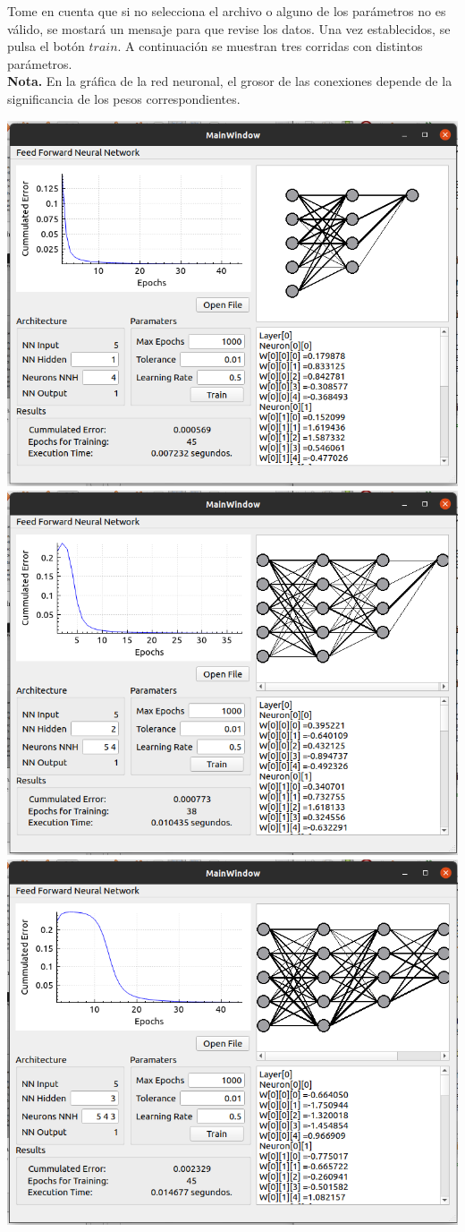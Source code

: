 \documentclass[12pt,letterpaper]{article}
\theoremstyle{definition}
\theoremstyle{definition}
\theoremstyle{definition}
\theoremstyle{definition}
\theoremstyle{definition}
\theoremstyle{definition}
\begin{document}
	Tome en cuenta que si no selecciona el archivo o alguno de los parámetros no es válido, se mostará un mensaje para que revise los datos. Una vez establecidos, se pulsa el botón $ train $. A continuación se muestran tres corridas con distintos parámetros.\\
	\textbf{Nota.} En la gráfica de la red neuronal, el grosor de las conexiones depende de la significancia de los pesos correspondientes.
	\begin{center}
		\includegraphics[width=0.7\linewidth]{1}
		\\	
		\includegraphics[width=0.7\linewidth]{2}
		\\
		\includegraphics[width=0.7\linewidth]{3}
	\end{center}
	
\end{document}
